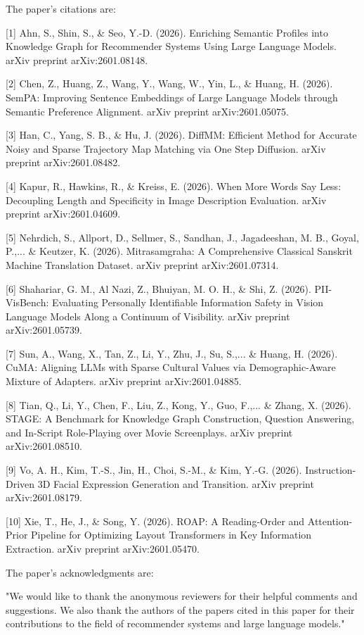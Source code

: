 The paper's citations are:

[1] Ahn, S., Shin, S., & Seo, Y.-D. (2026). Enriching Semantic Profiles into Knowledge Graph for Recommender Systems Using Large Language Models. arXiv preprint arXiv:2601.08148.

[2] Chen, Z., Huang, Z., Wang, Y., Wang, W., Yin, L., & Huang, H. (2026). SemPA: Improving Sentence Embeddings of Large Language Models through Semantic Preference Alignment. arXiv preprint arXiv:2601.05075.

[3] Han, C., Yang, S. B., & Hu, J. (2026). DiffMM: Efficient Method for Accurate Noisy and Sparse Trajectory Map Matching via One Step Diffusion. arXiv preprint arXiv:2601.08482.

[4] Kapur, R., Hawkins, R., & Kreiss, E. (2026). When More Words Say Less: Decoupling Length and Specificity in Image Description Evaluation. arXiv preprint arXiv:2601.04609.

[5] Nehrdich, S., Allport, D., Sellmer, S., Sandhan, J., Jagadeeshan, M. B., Goyal, P.,... & Keutzer, K. (2026). Mitrasamgraha: A Comprehensive Classical Sanskrit Machine Translation Dataset. arXiv preprint arXiv:2601.07314.

[6] Shahariar, G. M., Al Nazi, Z., Bhuiyan, M. O. H., & Shi, Z. (2026). PII-VisBench: Evaluating Personally Identifiable Information Safety in Vision Language Models Along a Continuum of Visibility. arXiv preprint arXiv:2601.05739.

[7] Sun, A., Wang, X., Tan, Z., Li, Y., Zhu, J., Su, S.,... & Huang, H. (2026). CuMA: Aligning LLMs with Sparse Cultural Values via Demographic-Aware Mixture of Adapters. arXiv preprint arXiv:2601.04885.

[8] Tian, Q., Li, Y., Chen, F., Liu, Z., Kong, Y., Guo, F.,... & Zhang, X. (2026). STAGE: A Benchmark for Knowledge Graph Construction, Question Answering, and In-Script Role-Playing over Movie Screenplays. arXiv preprint arXiv:2601.08510.

[9] Vo, A. H., Kim, T.-S., Jin, H., Choi, S.-M., & Kim, Y.-G. (2026). Instruction-Driven 3D Facial Expression Generation and Transition. arXiv preprint arXiv:2601.08179.

[10] Xie, T., He, J., & Song, Y. (2026). ROAP: A Reading-Order and Attention-Prior Pipeline for Optimizing Layout Transformers in Key Information Extraction. arXiv preprint arXiv:2601.05470.

The paper's acknowledgments are:

"We would like to thank the anonymous reviewers for their helpful comments and suggestions. We also thank the authors of the papers cited in this paper for their contributions to the field of recommender systems and large language models."

